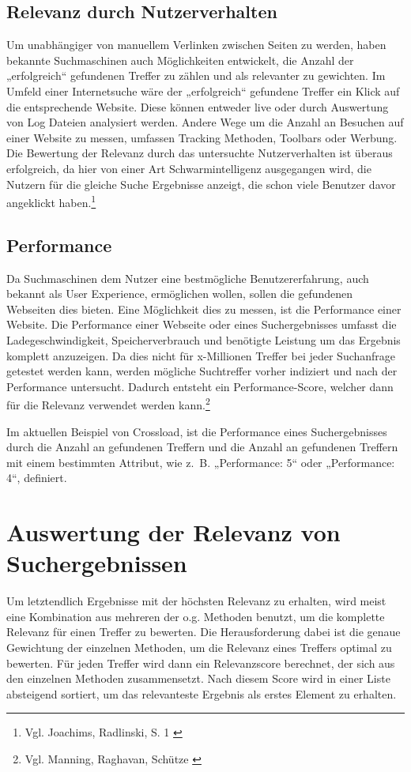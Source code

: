 \subsection{Relevanz durch Nutzerverhalten}
\label{sub:relevanceUser}
Um unabhängiger von manuellem Verlinken zwischen Seiten zu werden, haben bekannte Suchmaschinen auch Möglichkeiten entwickelt, die Anzahl der „erfolgreich“ gefundenen Treffer zu zählen und als relevanter zu gewichten.
Im Umfeld einer Internetsuche wäre der „erfolgreich“ gefundene Treffer ein Klick auf die entsprechende Website.
Diese können entweder live oder durch Auswertung von Log Dateien analysiert werden.
Andere Wege um die Anzahl an Besuchen auf einer Website zu messen, umfassen Tracking Methoden, Toolbars oder Werbung.
Die Bewertung der Relevanz durch das untersuchte Nutzerverhalten ist überaus erfolgreich, da hier von einer Art Schwarmintelligenz ausgegangen wird, die Nutzern für die gleiche Suche Ergebnisse anzeigt, die schon viele Benutzer davor angeklickt haben.\footnote{Vgl. Joachims, Radlinski, S. 1 \cite{joachims2007}}

\subsection{Performance}
\label{sub:relevancePerformance}
Da Suchmaschinen dem Nutzer eine bestmögliche Benutzererfahrung, auch bekannt als User Experience, ermöglichen wollen, sollen die gefundenen Webseiten dies bieten. Eine Möglichkeit dies zu messen, ist die Performance einer Website.
Die Performance einer Webseite oder eines Suchergebnisses umfasst die Ladegeschwindigkeit, Speicherverbrauch und benötigte Leistung um das Ergebnis komplett anzuzeigen.
Da dies nicht für x-Millionen Treffer bei jeder Suchanfrage getestet werden kann, werden mögliche Suchtreffer vorher indiziert und nach der Performance untersucht.
Dadurch entsteht ein Performance-Score, welcher dann für die Relevanz verwendet werden kann.\footnote{Vgl. Manning, Raghavan, Schütze \cite{manning2008}}

Im aktuellen Beispiel von Crossload, ist die Performance eines Suchergebnisses durch die Anzahl an gefundenen Treffern und die Anzahl an gefundenen Treffern mit einem bestimmten Attribut, wie z. B. „Performance: 5“ oder „Performance: 4“, definiert.

\clearpage
\section{Auswertung der Relevanz von Suchergebnissen}
\label{sec:relevanceScore}
Um letztendlich Ergebnisse mit der höchsten Relevanz zu erhalten, wird meist eine Kombination aus mehreren der o.g. Methoden benutzt, um die komplette Relevanz für einen Treffer zu bewerten.
Die Herausforderung dabei ist die genaue Gewichtung der einzelnen Methoden, um die Relevanz eines Treffers optimal zu bewerten.
Für jeden Treffer wird dann ein Relevanzscore berechnet, der sich aus den einzelnen Methoden zusammensetzt. Nach diesem Score wird in einer Liste absteigend sortiert, um das relevanteste Ergebnis als erstes Element zu erhalten.

